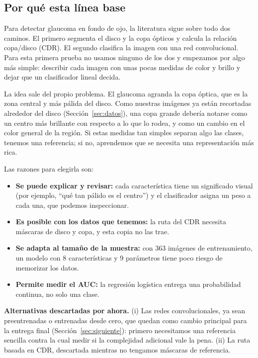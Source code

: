 \documentclass[pdflatex,sn-mathphys-num]{sn-jnl}%
\theoremstyle{thmstyleone}%
\theoremstyle{thmstyletwo}%
\theoremstyle{thmstylethree}%
\begin{document}
\subsection{Por qué esta línea base}

Para detectar glaucoma en fondo de ojo, la literatura sigue sobre todo dos caminos. El primero segmenta el disco y la copa ópticos y calcula la relación copa/disco (CDR). El segundo clasifica la imagen con una red convolucional. Para esta primera prueba no usamos ninguno de los dos y empezamos por algo más simple: describir cada imagen con unas pocas medidas de color y brillo y dejar que un clasificador lineal decida.

La idea sale del propio problema. El glaucoma agranda la copa óptica, que es la zona central y más pálida del disco. Como nuestras imágenes ya están recortadas alrededor del disco (Sección~\ref{sec:datos}), una copa grande debería notarse como un centro más brillante con respecto a lo que lo rodea, y como un cambio en el color general de la región. Si estas medidas tan simples separan algo las clases, tenemos una referencia; si no, aprendemos que se necesita una representación más rica.

Las razones para elegirla son:

\begin{itemize}
\item \textbf{Se puede explicar y revisar:} cada característica tiene un significado visual (por ejemplo, ``qué tan pálido es el centro'') y el clasificador asigna un peso a cada una, que podemos inspeccionar.
\item \textbf{Es posible con los datos que tenemos:} la ruta del CDR necesita máscaras de disco y copa, y esta copia no las trae.
\item \textbf{Se adapta al tamaño de la muestra:} con 363 imágenes de entrenamiento, un modelo con 8 características y 9 parámetros tiene poco riesgo de memorizar los datos.
\item \textbf{Permite medir el AUC:} la regresión logística entrega una probabilidad continua, no solo una clase.
\end{itemize}

\textbf{Alternativas descartadas por ahora.} (i) Las redes convolucionales, ya sean preentrenadas o entrenadas desde cero, que quedan como cambio principal para la entrega final (Sección~\ref{sec:siguiente}): primero necesitamos una referencia sencilla contra la cual medir si la complejidad adicional vale la pena. (ii) La ruta basada en CDR, descartada mientras no tengamos máscaras de referencia.
\end{document}
